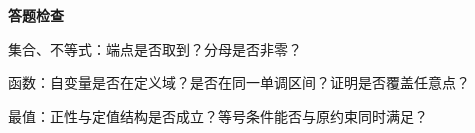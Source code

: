 \documentclass[UTF8,10pt,aspectratio=169]{ctexbeamer}
\newcommand{\PageHeading}[1]{\begin{center}{\Large\bfseries #1}\end{center}\vspace{0.12cm}}
\begin{document}
\begin{frame}[t]
\PageHeading{答题检查}
集合、不等式：端点是否取到？分母是否非零？
\par
\pause
函数：自变量是否在定义域？是否在同一单调区间？证明是否覆盖任意点？
\par
最值：正性与定值结构是否成立？等号条件能否与原约束同时满足？
\par
\end{frame}
\end{document}

